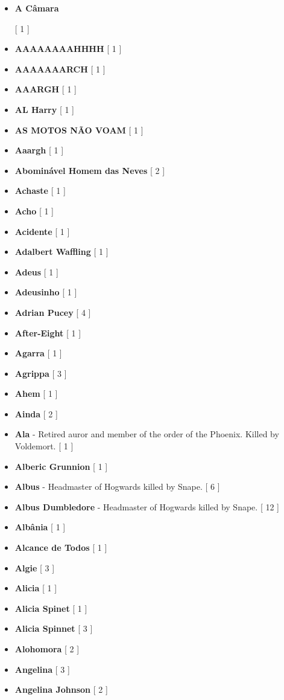 \documentclass[a4paper]{article}
\begin{document}
\begin{itemize}
	\item \hypertarget{A}{\textbf{A Câmara}} [ 1 ]
	\item \textbf{AAAAAAAAHHHH} [ 1 ]
	\item \textbf{AAAAAAARCH} [ 1 ]
	\item \textbf{AAARGH} [ 1 ]
	\item \textbf{AL Harry} [ 1 ]
	\item \textbf{AS MOTOS NÃO VOAM} [ 1 ]
	\item \textbf{Aaargh} [ 1 ]
	\item \textbf{Abominável Homem das Neves} [ 2 ]
	\item \textbf{Achaste} [ 1 ]
	\item \textbf{Acho} [ 1 ]
	\item \textbf{Acidente} [ 1 ]
	\item \textbf{Adalbert Waffling} [ 1 ]
	\item \textbf{Adeus} [ 1 ]
	\item \textbf{Adeusinho} [ 1 ]
	\item \textbf{Adrian Pucey} [ 4 ]
	\item \textbf{After-Eight} [ 1 ]
	\item \textbf{Agarra} [ 1 ]
	\item \textbf{Agrippa} [ 3 ]
	\item \textbf{Ahem} [ 1 ]
	\item \textbf{Ainda} [ 2 ]
	\item \textbf{Ala} - Retired auror and member of the order of the Phoenix. Killed by Voldemort. [ 1 ]
	\item \textbf{Alberic Grunnion} [ 1 ]
	\item \textbf{Albus} - Headmaster of Hogwards killed by Snape. [ 6 ]
	\item \textbf{Albus Dumbledore} - Headmaster of Hogwards killed by Snape. [ 12 ]
	\item \textbf{Albânia} [ 1 ]
	\item \textbf{Alcance de Todos} [ 1 ]
	\item \textbf{Algie} [ 3 ]
	\item \textbf{Alicia} [ 1 ]
	\item \textbf{Alicia Spinet} [ 1 ]
	\item \textbf{Alicia Spinnet} [ 3 ]
	\item \textbf{Alohomora} [ 2 ]
	\item \textbf{Angelina} [ 3 ]
	\item \textbf{Angelina Johnson} [ 2 ]

\end{itemize}
\end{document}
